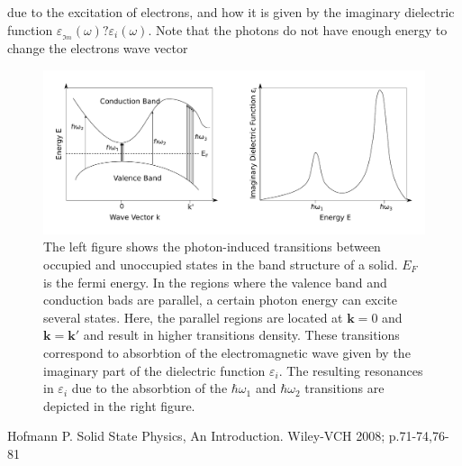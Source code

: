 due to the excitation of electrons, and how it is given by the imaginary dielectric function 
$\varepsilon\!_{_{\Im\! m}} \!\! (\omega) ? \varepsilon_i(\omega)$. Note that the photons do not have
enough energy to change the electrons wave vector
%
\begin{figure}[h!]
  \centering
   \includegraphics[width=1.0\textwidth]{Figures/bandstructureVSdielectric.pdf}
   \caption{
      The left figure shows the photon-induced transitions between occupied and unoccupied states in the band 
      structure of a solid. $E_F$ is the fermi energy. 
      In the regions where the valence band and conduction bads are parallel,
      a certain photon energy can excite several states. Here, the parallel regions are located at
      $\boldsymbol k = 0$ and $\boldsymbol k = \boldsymbol k'$ and result in higher transitions density.
      These transitions correspond to absorbtion of the electromagnetic wave given by the imaginary part of
      the dielectric function $\varepsilon_i$. The resulting resonances in $\varepsilon_i$ due to 
      the absorbtion of the $\hbar \omega_1$ and $\hbar \omega_2$ transitions are depicted in the right
      figure.
   }
   \label{fig:transitionResonance}
\end{figure}
%






\begin{thebibliography}{9}

         Hofmann P.
         Solid State Physics, An Introduction.
         Wiley-VCH 2008; p.71-74,76-81

\end{thebibliography}




